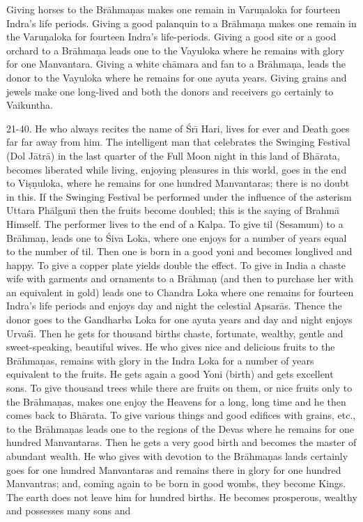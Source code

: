 Giving horses to the Br\=ahma\d{n}as makes one remain in Varu\d{n}aloka for fourteen Indra's life periods. Giving a good palanquin to a Br\=ahma\d{n}a makes one remain in the Varu\d{n}aloka for fourteen Indra's life-periods. Giving a good site or a good orchard to a Br\=ahma\d{n}a leads one to the Vayuloka where he remains with glory for one Manvantara. Giving a white ch\=amara and fan to a Br\=ahma\d{n}a, leads the donor to the Vayuloka where he remains for one ayuta years. Giving grains and jewels make one long-lived and both the donors and receivers go certainly to Vaikuntha.

21-40. He who always recites the name of \'Sr\={\i} Hari, lives for ever and Death goes far far away from him. The intelligent man that celebrates the Swinging Festival (Dol J\=atr\=a) in the last quarter of the Full Moon night in this land of Bh\=arata, becomes liberated while living, enjoying pleasures in this world, goes in the end to Vi\d{s}\d{n}uloka, where he remains for one hundred Manvantaras; there is no doubt in this. If the Swinging Festival be performed under the influence of the asterism Uttara Ph\=algun\={\i} then the fruits become doubled; this is the saying of Brahm\=a Himself. The performer lives to the end of a Kalpa. To give til (Sesamum) to a Br\=ahma\d{n}, leads one to \'Siva Loka, where one enjoys for a number of years equal to the number of til. Then one is born in a good yoni and becomes longlived and happy. To give a copper plate yields double the effect. To give in India a chaste wife with garments and ornaments to a Br\=ahma\d{n} (and then to purchase her with an equivalent in gold) leads one to Chandra Loka where one remains for fourteen Indra's life periods and enjoys day and night the celestial Apsar\=as. Thence the donor goes to the Gandharba Loka for one ayuta years and day and night enjoys Urva\'s\={\i}. Then he gets for thousand births chaste, fortunate, wealthy, gentle and sweet-speaking, beautiful wives. He who gives nice and delicious fruits to the Br\=ahma\d{n}as, remains with glory in the Indra Loka for a number of years equivalent to the fruits. He gets again a good Yoni (birth) and gets excellent sons. To give thousand trees while there are fruits on them, or nice fruits only to the Br\=ahma\d{n}as, makes one enjoy the Heavens for a long, long time and he then comes back to Bh\=arata. To give various things and good edifices with grains, etc., to the Br\=ahma\d{n}as leads one to the regions of the Devas where he remains for one hundred Manvantaras. Then he gets a very good birth and becomes the master of abundant wealth. He who gives with devotion to the Br\=ahma\d{n}as lands certainly goes for one hundred Manvantaras and remains there in glory for one hundred Manvantras; and, coming again to be born in good wombs, they become Kings. The earth does not leave him for hundred births. He becomes prosperous, wealthy and possesses many sons and

